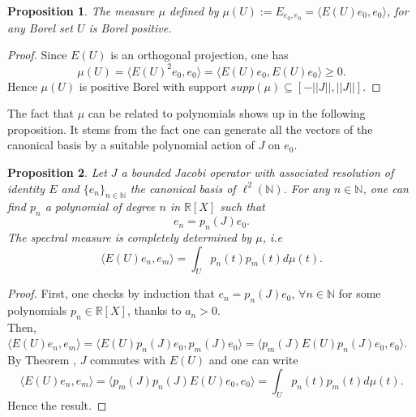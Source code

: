 \documentclass[10pt]{book}
\theoremstyle{break}
\newtheorem{proposition}{Proposition}
\begin{document}
\begin{proposition}
The measure $\mu$ defined by $\mu(U):=E_{e_0,e_0}=\langle E(U)e_0,e_0 \rangle$, for any Borel set $U$ is Borel positive.
\end{proposition}
\begin{proof}
Since $E(U)$ is an orthogonal projection, one has 
\begin{equation}
\mu(U)=\langle E(U)^2e_0,e_0  \rangle=\langle E(U)e_0,E(U)e_0\rangle\ge0. 
\end{equation}
Hence $\mu(U)$ is positive Borel with support $supp(\mu)\subseteq[-||J||,||J||]$. 
\end{proof}
The fact that $\mu$ can be related to polynomials shows up in the following proposition. It stems from the fact one can generate all the vectors of the canonical basis by a suitable polynomial action of $J$ on $e_0$.
\begin{proposition}
Let $J$ a bounded Jacobi operator with associated resolution of identity $E$ and $\{e_n\}_{n\in\mathbb{N}}$ the canonical basis of $\ell^2(\mathbb{N})$. For any $n\in\mathbb{N}$, one can find $p_n$ a polynomial of degree $n$ in $\mathbb{R}[X]$ such that
\begin{equation}
e_n=p_n(J)e_0.
\end{equation}
The spectral measure is completely determined by $\mu$, i.e
\begin{equation}
\langle E(U)e_n,e_m \rangle=\int_{U}p_n(t)p_m(t)d\mu(t).
\end{equation}
\end{proposition}
\begin{proof}
First, one checks by induction that $e_n=p_n(J)e_0$, $\forall n\in\mathbb{N}$ for some polynomials $p_n\in\mathbb{R}[X]$, thanks to $a_n>0$. \\
Then, $\langle E(U)e_n,e_m \rangle=\langle E(U)p_n(J)e_0,p_m(J)e_0\rangle=\langle p_m(J)E(U)p_n(J)e_0,e_0\rangle$. By Theorem %
, $J$ commutes with $E(U)$ and one can write 
\begin{equation}
\langle E(U)e_n,e_m \rangle=\langle p_m(J)p_n(J)E(U)e_0,e_0\rangle=\int_{U}p_n(t)p_m(t)d\mu(t).
\end{equation}
Hence the result.
\end{proof}
\end{document}
